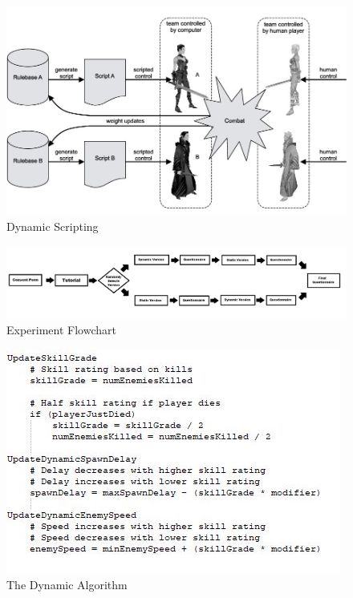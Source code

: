 \documentclass[journal]{IEEEtran}
\begin{document}
\begin{figure}[h]
	\includegraphics[width=1.0\linewidth]{dynamicscripting.jpg}
	\caption{Dynamic Scripting}
	\label{fig::21}
\end{figure} 

\begin{figure}[h]
	\includegraphics[width=1.0\linewidth]{ArtefactFlowchart.jpg}
	\caption{Experiment Flowchart}
	\label{fig::22}
\end{figure} 

\begin{figure}[h]
	\includegraphics[width=1.5\linewidth]{pseudocodedynamic.jpg}
	\caption{The Dynamic Algorithm}
	\label{fig::23}
\end{figure} 
\end{document}
